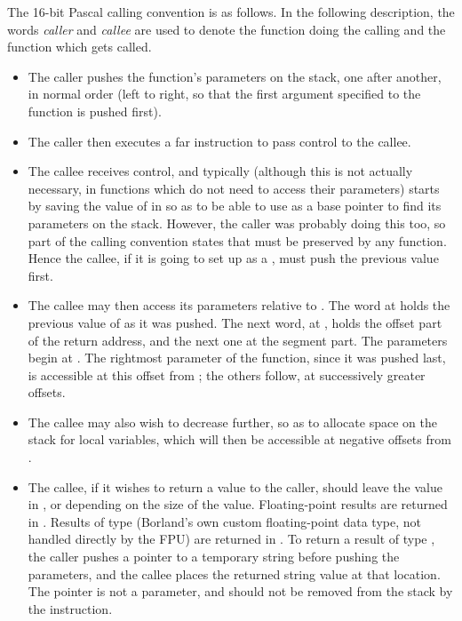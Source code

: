 
The 16-bit Pascal calling convention is as follows. In
the following description, the words \emph{caller} and \emph{callee} are
used to denote the function doing the calling and the function which
gets called.

\begin{itemize}
    \item{The caller pushes the function's parameters on the stack, one
        after another, in normal order (left to right, so that the first
        argument specified to the function is pushed first).}

    \item{The caller then executes a far  instruction to pass
        control to the callee.}

    \item{The callee receives control, and typically (although this is not
        actually necessary, in functions which do not need to access their
        parameters) starts by saving the value of  in  so as to
        be able to use  as a base pointer to find its parameters on
        the stack. However, the caller was probably doing this too, so part
        of the calling convention states that  must be preserved by
        any function. Hence the callee, if it is going to set up  as a
        , must push the previous value first.}

    \item{The callee may then access its parameters relative to .
        The word at \code{[BP]} holds the previous value of  as it was
        pushed. The next word, at \code{[BP+2]}, holds the offset part of the
        return address, and the next one at \code{[BP+4]} the segment part. The
        parameters begin at \code{[BP+6]}. The rightmost parameter of the
        function, since it was pushed last, is accessible at this offset
        from ; the others follow, at successively greater offsets.}

    \item{The callee may also wish to decrease  further, so as to
        allocate space on the stack for local variables, which will then be
        accessible at negative offsets from .}

    \item{The callee, if it wishes to return a value to the caller, should
        leave the value in ,  or  depending on
        the size of the value. Floating-point results are returned in .
        Results of type  (Borland's own custom floating-point data
        type, not handled directly by the FPU) are returned in .
        To return a result of type , the caller pushes a pointer
        to a temporary string before pushing the parameters, and the callee
        places the returned string value at that location. The pointer is
        not a parameter, and should not be removed from the stack by the
         instruction.}


\end{itemize}
